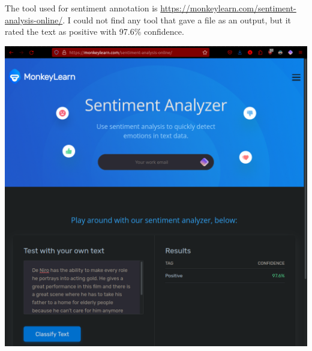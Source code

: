 \documentclass[conference]{IEEEtran}
\begin{document}
\begin{enumerate}
\newpage

The tool used for sentiment annotation is \url{https://monkeylearn.com/sentiment-analysis-online/}. I could not find any tool that gave a file as an output, but it rated the text as positive with 97.6\% confidence.
\begin{center}
\includegraphics[scale=0.4]{sentiment_annotation_screenshot.png}
\end{center}


\end{enumerate}
\end{document}
